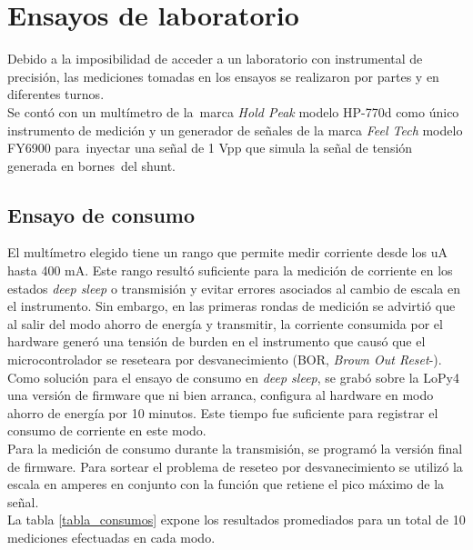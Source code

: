 \section{Ensayos de laboratorio}
Debido a la imposibilidad de acceder a un laboratorio con instrumental de precisión, las mediciones tomadas en los ensayos se realizaron por partes y en diferentes turnos.\\
Se contó con un multímetro de la marca \textit{Hold Peak} modelo HP-770d \citep{hp770d} como único instrumento de medición y un generador de señales de la marca \textit{Feel Tech} modelo FY6900 para inyectar una señal de 1 Vpp que simula la señal de tensión generada en bornes del shunt.

\subsection{Ensayo de consumo}
El mult\'{i}metro elegido tiene un rango que permite medir corriente desde los uA hasta 400 mA. Este rango resultó suficiente para la medición de corriente en los estados \textit{deep sleep} o transmisión y evitar errores asociados al cambio de escala en el instrumento. Sin embargo, en las primeras rondas de medición se advirtió que al salir del modo ahorro de energía y transmitir, la corriente consumida por el hardware generó una tensión de burden en el instrumento que causó que el microcontrolador se reseteara por desvanecimiento (BOR, \textit{Brown Out Reset}-).\\
Como solución para el ensayo de consumo en \textit{deep sleep}, se grabó sobre la LoPy4 una versión de firmware que ni bien arranca, configura al hardware en modo ahorro de energía por 10 minutos. Este tiempo fue suficiente para registrar el consumo de corriente en este modo.\\
Para la medición de consumo durante la transmisión, se programó la versión final de firmware. Para sortear el problema de reseteo por desvanecimiento se utilizó la escala en amperes en conjunto con la función que retiene el pico máximo de la señal.\\
La tabla \ref{tabla_consumos} expone los resultados promediados para un total de 10 mediciones efectuadas en cada modo.\\
